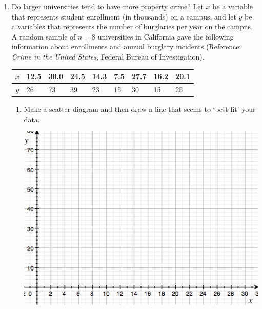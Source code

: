 \documentclass{article}
\begin{document}
\newcommand{\answer}[1]{\color{white}#1}

\pagestyle{myheadings}

\begin{center}
\textbf{}
\end{center}

\begin{enumerate}

\item Do larger universities tend to have more property crime?  Let $x$ be a variable that represents student enrollment (in thousands) on a campus, and let $y$ be a variables that represents the number of burglaries per year on the campus.  A random sample of $n=8$ universities in California gave the following information about enrollments and annual burglary incidents (Reference: {\em Crime in the United States}, Federal Bureau of Investigation). 

\begin{center}
\begin{tabular}{c|llllllll}
\hline
$x$ & 12.5 & 30.0 & 24.5 & 14.3 & 7.5 & 27.7 & 16.2 & 20.1 \\
\hline
$y$ & 26 & 73 & 39 & 23 & 15 & 30 & 15 & 25 \\
\hline
\end{tabular}
\end{center}

	\begin{enumerate}
	\item Make a scatter diagram and then draw a line that seems to `best-fit' your data. 
	
	\begin{center}
	\includegraphics[scale=0.7]{WS23_1Grid.jpg} 
	\end{center}
	

\end{enumerate}
\end{enumerate}
\end{document}
